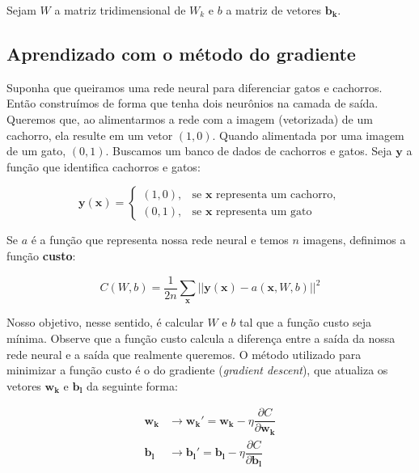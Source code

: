 \documentclass{article}
\begin{document}
            Sejam $W$ a matriz tridimensional de $W_k$ e $b$ a matriz de vetores $\mathbf{b_k}$.

        \subsection{Aprendizado com o método do gradiente}
        
            Suponha que queiramos uma rede neural para diferenciar gatos e cachorros.
            Então construímos de forma que tenha dois neurônios na camada de saída.
            Queremos que, ao alimentarmos a rede com a imagem (vetorizada) de um cachorro, ela resulte em um vetor $(1, 0)$.
            Quando alimentada por uma imagem de um gato, $(0, 1)$.
            Buscamos um banco de dados de cachorros e gatos. Seja $\mathbf{y}$ a função que identifica cachorros e gatos:

            \begin{equation}
                \mathbf{y}(\mathbf{x}) =    \begin{cases}
                                                (1, 0), & \textrm{se } \mathbf{x} \textrm{ representa um cachorro}, \\
                                                (0, 1), & \textrm{se } \mathbf{x} \textrm{ representa um gato}
                                            \end{cases}
            \end{equation}

            Se $a$ é a função que representa nossa rede neural e temos $n$ imagens, definimos a função \textbf{custo}:
            
            \begin{equation}
                C(W, b) = \dfrac{1}{2n} \sum_{\mathbf{x}} ||\mathbf{y}(\mathbf{x}) - a(\mathbf{x}, W, b)||^2
            \end{equation}

            Nosso objetivo, nesse sentido, é calcular $W$ e $b$ tal que a função custo seja mínima.
            Observe que a função custo calcula a diferença entre a saída da nossa rede neural e a saída que realmente queremos.
            O método utilizado para minimizar a função custo é o do gradiente (\textit{gradient descent}), que atualiza os vetores $\mathbf{w_k}$ e $\mathbf{b_l}$ da seguinte forma:

            \begin{equation}
                \begin{split}
                    \mathbf{w_k} &\rightarrow \mathbf{w_k'} = \mathbf{w_k} - \eta \dfrac{\partial C}{\partial \mathbf{w_k}} \\
                    \mathbf{b_l} &\rightarrow \mathbf{b_l'} = \mathbf{b_l} - \eta \dfrac{\partial C}{\partial \mathbf{b_l}}
                \end{split}
            \end{equation}
\end{document}
